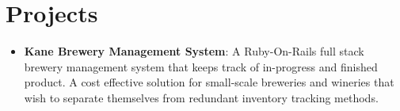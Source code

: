 \documentclass[letterpaper,11pt]{article}
\newcommand{\resumeItem}[2]{
  \item\small{
    \textbf{#1}{: #2 \vspace{-2pt}}
  }
}
\newcommand{\resumeSubItem}[2]{\resumeItem{#1}{#2}\vspace{-4pt}}
\newcommand{\resumeSubHeadingListStart}{\begin{itemize}[leftmargin=*]}
\newcommand{\resumeSubHeadingListEnd}{\end{itemize}}
\begin{document}
\section{Projects}
  \resumeSubHeadingListStart
    \resumeSubItem{Kane Brewery Management System}
      {A Ruby-On-Rails full stack brewery management system that keeps track of in-progress and finished product. A cost effective solution for small-scale breweries and wineries that wish to separate themselves from redundant inventory tracking methods.}
  \resumeSubHeadingListEnd

%


\end{document}
